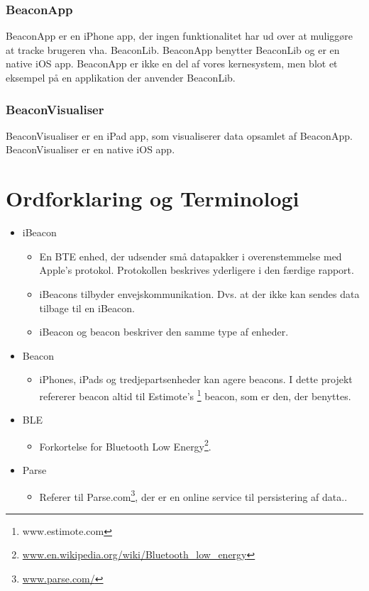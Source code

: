 \subsubsection{BeaconApp}
BeaconApp er en iPhone app, der ingen funktionalitet har ud over at muliggøre at tracke brugeren vha. BeaconLib. BeaconApp benytter BeaconLib og er en native iOS app. BeaconApp er ikke en del af vores kernesystem, men blot et eksempel på en applikation der anvender BeaconLib.

\subsubsection{BeaconVisualiser}
BeaconVisualiser er en iPad app, som visualiserer data opsamlet af BeaconApp. BeaconVisualiser er en native iOS app.

\section{Ordforklaring og Terminologi}

\begin{itemize}
	\item iBeacon
		\begin{itemize}
			\item En BTE enhed, der udsender små datapakker i overenstemmelse med Apple's protokol. Protokollen beskrives yderligere i den færdige rapport.
			\item iBeacons tilbyder envejskommunikation. Dvs. at der ikke kan sendes data tilbage til en iBeacon.
			\item iBeacon og beacon beskriver den samme type af enheder.
		\end{itemize}
		
	\item Beacon
		\begin{itemize}
			\item iPhones, iPads og tredjepartsenheder kan agere beacons. I dette projekt refererer beacon altid til Estimote's \footnote{www.estimote.com} beacon, som er den, der benyttes.
		\end{itemize}
		
	\item BLE
		\begin{itemize}
			\item Forkortelse for Bluetooth Low Energy\footnote{\url{www.en.wikipedia.org/wiki/Bluetooth_low_energy}}.
		\end{itemize}
		
	\item Parse
		\begin{itemize}
			\item Referer til Parse.com\footnote{\url{www.parse.com/}}, der er en online service til persistering af data..
		\end{itemize}
\end{itemize}